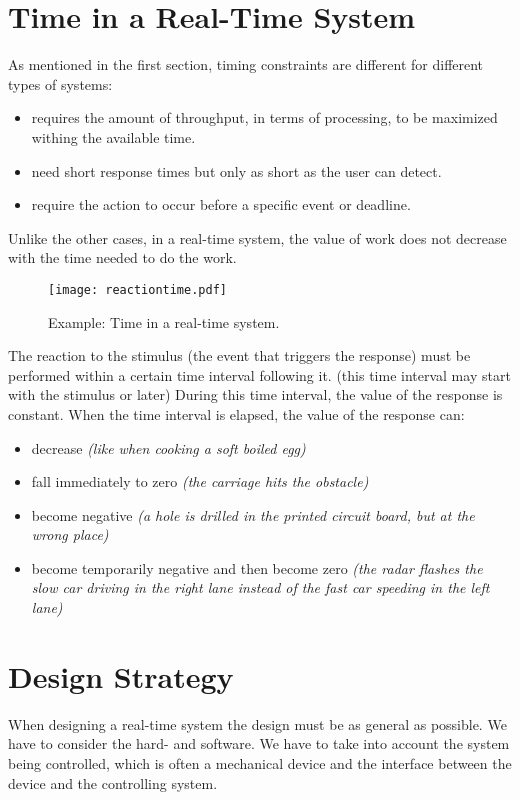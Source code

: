 \documentclass[../main.tex]{subfiles}
\begin{document}
\section{Time in a Real-Time System}
As mentioned in the first section, timing constraints are different for different types of systems:
\begin{itemize}
	\item {} requires the amount of throughput, in terms of processing, to be maximized withing the available time.
	\item {} need short response times but only as short as the user can detect.
	\item {} require the action to occur before a specific event or deadline.
\end{itemize}
Unlike the other cases, in a real-time system, the value of work does not decrease with the time needed to do the work. 

\begin{figure}[H]
    \centering
    \texttt{[image: reactiontime.pdf]}
    \caption{Example: Time in a real-time system.}
    \label{rttime}
\end{figure}
The reaction to the stimulus (the event that triggers the response) must be performed within a certain time interval following it. (this time interval may start with the stimulus or later) During this time interval, the value of the response is constant. When the time interval is elapsed, the value of the response can:
\begin{itemize}
	\item decrease \textit{(like when cooking a soft boiled egg)}
	\item fall immediately to zero \textit{(the carriage hits the obstacle)}
	\item become negative \textit{(a hole is drilled in the printed circuit board, but at the wrong place)}
	\item become temporarily negative and then become zero\textit{ (the radar flashes the slow car driving in the right lane instead of the fast car speeding in the left lane)}
\end{itemize}

\section{Design Strategy}
When designing a real-time system the design must be as general as possible. We have to consider the hard- and software. We have to take into account the system being controlled, which is often a mechanical device and the interface between the device and the controlling system.
\end{document}
